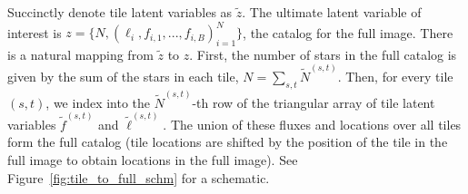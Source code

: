 Succinctly denote tile latent variables as $\tilde z$.
The ultimate latent variable of interest is $z = \{N, (\ell_i, f_{i,1}, ..., f_{i,B})_{i = 1}^N\}$, the catalog for the full image.
There is a natural mapping from $\tilde z$ to $z$. 
First, the number of stars in the full catalog is given by the sum of the stars in each tile, $N = \sum_{s,t} \tilde N^{(s, t)}$. 
Then, for every tile $(s,t)$, we index into the $\tilde N^{(s,t)}$-th row of the triangular array of tile latent variables $\tilde f^{(s,t)}$ and $\tilde \ell^{(s,t)}$. 
The union of these fluxes and locations over all tiles form the full catalog (tile locations are shifted by the position of the tile in the full image to obtain locations in the full image). 
See Figure~\ref{fig:tile_to_full_schm} for a schematic.





